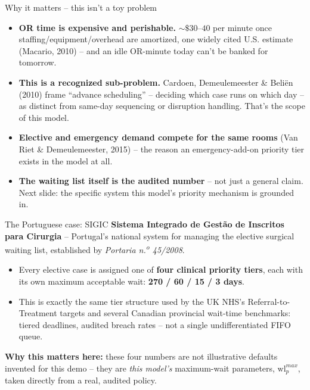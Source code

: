 \documentclass[aspectratio=169]{beamer}
\begin{document}
\begin{frame}{Why it matters -- this isn't a toy problem}
  \begin{itemize}
    \item \textbf{OR time is expensive and perishable.} $\sim\$30$--$40$ per
      minute once staffing/equipment/overhead are amortized, one widely
      cited U.S. estimate (Macario, 2010) -- and an idle OR-minute today
      can't be banked for tomorrow.
    \item \textbf{This is a recognized sub-problem.} Cardoen, Demeulemeester
      \& Beli\"en (2010) frame ``advance scheduling'' -- deciding which case
      runs on which day -- as distinct from same-day sequencing or
      disruption handling. That's the scope of this model.
    \item \textbf{Elective and emergency demand compete for the same
      rooms} (Van Riet \& Demeulemeester, 2015) -- the reason an
      emergency-add-on priority tier exists in the model at all.
    \item \textbf{The waiting list itself is the audited number} -- not just
      a general claim. Next slide: the specific system this model's
      priority mechanism is grounded in.
  \end{itemize}
\end{frame}

\begin{frame}{The Portuguese case: SIGIC}
  \textbf{Sistema Integrado de Gest\~ao de Inscritos para Cirurgia} --
  Portugal's national system for managing the elective surgical waiting
  list, established by \emph{Portaria n.\textsuperscript{o} 45/2008}.
  \begin{itemize}
    \item Every elective case is assigned one of \textbf{four clinical
      priority tiers}, each with its own maximum acceptable wait:
      \textbf{270 / 60 / 15 / 3 days}.
    \item This is exactly the same tier structure used by the UK NHS's
      Referral-to-Treatment targets and several Canadian provincial
      wait-time benchmarks: tiered deadlines, audited breach rates -- not
      a single undifferentiated FIFO queue.
  \end{itemize}
  \pause
  \textbf{Why this matters here:} these four numbers are not illustrative
  defaults invented for this demo -- they are \emph{this model's} maximum-wait
  parameters, $\text{wl}^{max}_p$, taken directly from a real, audited policy.
\end{frame}
\end{document}
